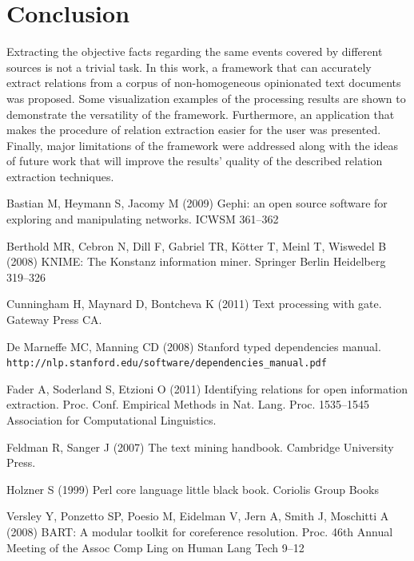 \documentclass[]{article}
\begin{document}
\section{Conclusion}
%
Extracting the objective facts regarding the same events covered by different sources is not a trivial task. In this work, a framework that can accurately extract relations from a corpus of non-homogeneous opinionated text documents was proposed. Some visualization examples of the processing results are shown to demonstrate the versatility of the framework. Furthermore, an application that makes the procedure of relation extraction easier for the user was presented. Finally, major limitations of the framework were addressed along with the ideas of future work that will improve the results' quality of the described relation extraction techniques.
%
%
\begin{thebibliography}{99}
%

Bastian M, Heymann S, Jacomy M (2009)
Gephi: an open source software for exploring and manipulating networks.
ICWSM 361--362

Berthold MR, Cebron N, Dill F, Gabriel TR, Kötter T, Meinl T, Wiswedel B (2008)
KNIME: The Konstanz information miner.
Springer Berlin Heidelberg 319--326

Cunningham H, Maynard D, Bontcheva K (2011)
Text processing with gate.
Gateway Press CA.

De Marneffe MC, Manning CD (2008)
Stanford typed dependencies manual. \texttt{http://nlp.stanford.edu/software/dependencies\_manual.pdf}

Fader A, Soderland S, Etzioni O (2011) 
Identifying relations for open information extraction. 
Proc. Conf. Empirical Methods in Nat. Lang. Proc. 1535--1545
Association for Computational Linguistics.

Feldman R, Sanger J (2007) 
The text mining handbook.
Cambridge University Press.

Holzner S (1999)
Perl core language little black book. 
Coriolis Group Books

Versley Y, Ponzetto SP, Poesio M, Eidelman V, Jern A, Smith J, Moschitti A (2008)
BART: A modular toolkit for coreference resolution.
Proc. 46th Annual Meeting of the Assoc Comp Ling on Human Lang Tech 9--12

\end{thebibliography}
\end{document}
